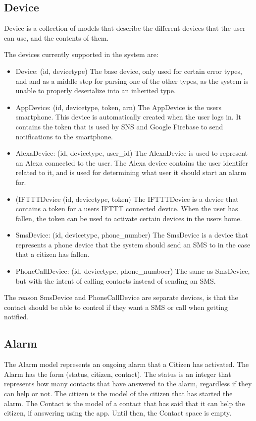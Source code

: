 \subsection{Device}
Device is a collection of models that describe the different devices that the user can use, and the contents of them.

The devices currently supported in the system are:
\begin{itemize}
    \item Device: (id, devicetype)
    The base device, only used for certain error types, and and as a middle step for parsing one of the other types, as the system is unable to properly deserialize into an inherited type.
    \item AppDevice: (id, devicetype, token, arn)
    The AppDevice is the users smartphone. This device is automatically created when the user logs in. It contains the token that is used by SNS and Google Firebase to send notifications to the smartphone.
    \item AlexaDevice: (id, devicetype, user\_id) 
    The AlexaDevice is used to represent an Alexa connected to the user. The Alexa device contains the user identifer related to it, and is used for determining what user it should start an alarm for.
    \item (IFTTTDevice (id, devicetype, token)
    The IFTTTDevice is a device that contains a token for a users IFTTT connected device. When the user has fallen, the token can be used to activate certain devices in the users home.
    \item SmsDevice: (id, devicetype, phone\_number) 
    The SmsDevice is a device that represents a phone device that the system should send an SMS to in the case that a citizen has fallen.
    \item PhoneCallDevice: (id, devicetype, phone\_numboer)
    The same as SmsDevice, but with the intent of calling contacts instead of sending an SMS.
\end{itemize}

The reason SmsDevice and PhoneCallDevice are separate devices, is that the contact should be able to control if they want a SMS or call when getting notified.

\subsection{Alarm}
The Alarm model represents an ongoing alarm that a Citizen has activated. The Alarm has the form (status, citizen, contact). The status is an integer that represents how many contacts that have answered to the alarm, regardless if they can help or not. The citizen is the model of the citizen that has started the alarm. The Contact is the model of a contact that has said that it can help the citizen, if answering using the app. Until then, the Contact space is empty.


